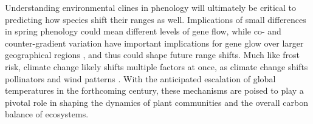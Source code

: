 \documentclass[12pt]{article}
\begin{document}
Understanding environmental clines in phenology will ultimately be critical to predicting how species shift their ranges as well. Implications of small differences in spring phenology could mean different levels of gene flow, while co- and counter-gradient variation have important implications for gene glow over larger geographical regions \citep{bach20}, and thus could shape future range shifts. Much like frost risk, climate change likely shifts multiple factors at once, as climate change shifts pollinators and wind patterns \citep{kling21}. With the anticipated escalation of global temperatures in the forthcoming century, these mechanisms are poised to play a pivotal role in shaping the dynamics of plant communities and the overall carbon balance of ecosystems.



\end{document}
